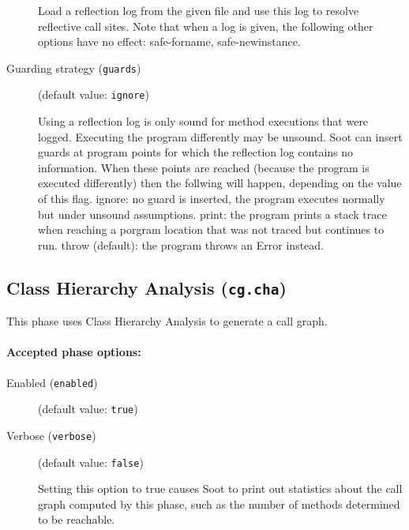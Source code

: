 \documentclass{article}
\begin{document}
\begin{description}
Load a reflection log
from the given file and use this log to resolve reflective call sites. Note that
when a log is given, the following other options have no effect: safe-forname,
safe-newinstance.                                         



\item[Guarding strategy ({\tt guards})]
(default value: {\tt ignore})



Using a reflection log is only sound for method executions that were logged.
Executing the program differently may be unsound. Soot can insert guards at program points for which the reflection log
contains no information. When these points are reached (because the program is executed differently) then the follwing will happen,
depending on the value of this flag. ignore: no guard is inserted, the program executes normally but under unsound assumptions.
print: the program prints a stack trace when reaching a porgram location that was not traced but continues to run. throw (default):
the program throws an Error instead.                                                                                                



\end{description}

\subsection{Class Hierarchy Analysis ({\tt cg.cha})}
This phase uses Class Hierarchy Analysis to generate a call graph.

\paragraph{Accepted phase options:} 

\begin{description}

\item[Enabled ({\tt enabled})]
(default value: {\tt true})






\item[Verbose ({\tt verbose})]
(default value: {\tt false})



Setting this option to true causes Soot to print out statistics about the call graph computed by this phase, such as the number of methods determined to be reachable.


\end{description}
\end{document}
